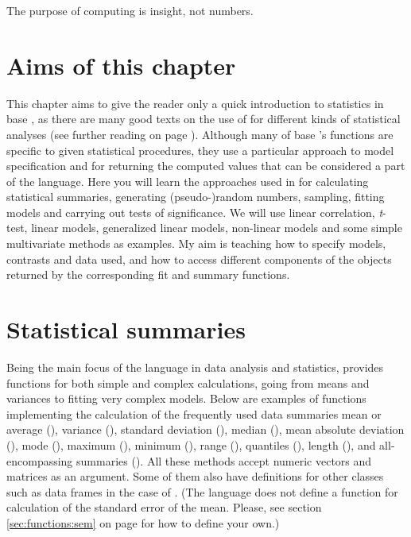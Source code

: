 \documentclass[krantz2]{krantz}\usepackage{knitr}
\begin{document}
\begin{VF}
The purpose of computing is insight, not numbers.

\nocite{Hamming1987}
\end{VF}

\section{Aims of this chapter}

This chapter aims to give the reader only a quick introduction to statistics in base \Rlang, as there are many good texts on the use of \Rpgrm for different kinds of statistical analyses (see further reading on page \pageref{sec:stat:further:reading}). Although many of base \R's functions are specific to given statistical procedures, they use a particular approach to model specification and for returning the computed values that can be considered a part of the \Rlang language. Here you will learn the approaches used in \Rlang for calculating statistical summaries, generating (pseudo-)random numbers, sampling, fitting models and carrying out tests of significance. We will use linear correlation, \emph{t}-test, linear models, generalized linear models, non-linear models and some simple multivariate methods as examples. My aim is teaching how to specify models, contrasts and data used, and how to access different components of the objects returned by the corresponding fit and summary functions.


\section{Statistical summaries}
Being the main focus of the \Rlang language in data analysis and statistics, \Rlang provides functions for both simple and complex calculations, going from means and variances to fitting very complex models. Below are examples of functions implementing the calculation of the frequently used data summaries mean or average (), variance (), standard deviation (), median (), mean absolute deviation (), mode (), maximum (), minimum (), range (), quantiles (), length (), and all-encompassing summaries (). All these methods accept numeric vectors and matrices as an argument. Some of them also have definitions for other classes such as data frames in the case of . (The \Rlang language does not define a function for calculation of the standard error of the mean. Please, see section \ref{sec:functions:sem} on page \pageref{sec:functions:sem} for how to define your own.)
\end{document}
